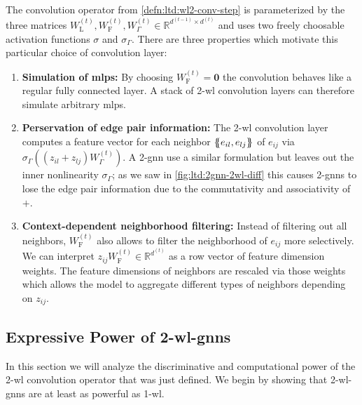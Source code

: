 The convolution operator from \cref{defn:ltd:wl2-conv-step} is parameterized by the three matrices $W_{\mathrm{L}}^{(t)}, W_{\mathrm{F}}^{(t)},  W_{\Gamma}^{(t)} \in \mathbb{R}^{d^{(t-1)} \times d^{(t)}}$ and uses two freely choosable activation functions $\sigma$ and $\sigma_{\Gamma}$.
There are three properties which motivate this particular choice of convolution layer:
\begin{enumerate}[label=\textbf{\arabic*.}]
	\item \textbf{Simulation of \acp{mlp}:}
		By choosing $W_{\mathrm{F}}^{(t)} = \mathbf{0}$ the convolution behaves like a regular fully connected layer.
		A stack of 2-\acs{wl} convolution layers can therefore simulate arbitrary \acp{mlp}.
	\item \textbf{Perservation of edge pair information:}
		The 2-\acs{wl} convolution layer computes a feature vector for each neighbor $\ldblbrace e_{il}, e_{lj} \rdblbrace$ of $e_{ij}$ via $\sigma_{\Gamma}\left(\left( z_{il} + z_{lj} \right) W_{\Gamma}^{(t)} \right)$.
		A 2-\acs{gnn} use a similar formulation but leaves out the inner nonlinearity $\sigma_{\Gamma}$;
		as we saw in \cref{fig:ltd:2gnn-2wl-diff} this causes 2-\acsp{gnn} to lose the edge pair information due to the commutativity and associativity of $+$.
	\item \textbf{Context-dependent neighborhood filtering:}
		Instead of filtering out all neighbors, $W_{\mathrm{F}}^{(t)}$ also allows to filter the neighborhood of $e_{ij}$ more selectively.
		We can interpret $z_{ij} W_{\mathrm{F}}^{(t)} \in \mathbb{R}^{d^{(t)}}$ as a row vector of feature dimension weights.
		The feature dimensions of neighbors are rescaled via those weights which allows the model to aggregate different types of neighbors depending on $z_{ij}$.
\end{enumerate}

\subsection{Expressive Power of 2-\acs*{wl}-\acsp*{gnn}}%
\label{sec:ltd:wl2gnn:properties}

In this section we will analyze the discriminative and computational power of the 2-\ac{wl} convolution operator that was just defined.
We begin by showing that 2-\acs{wl}-\acsp{gnn} are at least as powerful as 1-\acs{wl}.

